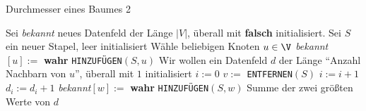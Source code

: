 \begin{solution}
	\phantom{}
		\begin{algorithm}
		\caption{Durchmesser eines Baumes 2} 
		\begin{algorithmic}[1]
			\State Sei \textit{bekannt} neues Datenfeld der Länge $|V|$, überall mit \textbf{falsch} initialisiert.
			\State Sei $S$ ein neuer Stapel, leer initialisiert
			\State Wähle beliebigen Knoten $u \in \V$ 
			\State \textit{bekannt}$[u] :=$ \textbf{wahr}
			\State \verb|HINZUFÜGEN|$(S,u)$
			\State Wir wollen ein Datenfeld $d$ der Länge ``Anzahl Nachbarn von $u$'', überall mit $1$ initialisiert 
			\State $i := 0$
			\State $v :=$ \verb|ENTFERNEN|$(S)$
			\State $i := i + 1$
			\Else
			\State $d_i := d_i + 1$
			\EndIf
			\State  \textit{bekannt}$[w] :=$ \textbf{wahr}
			\State \verb|HINZUFÜGEN|$(S,w)$
			\EndIf
			\EndFor
			\EndWhile
			\State \Return Summe der zwei größten Werte von $d$
			\EndProcedure
		\end{algorithmic}
	\end{algorithm}
\end{solution}

